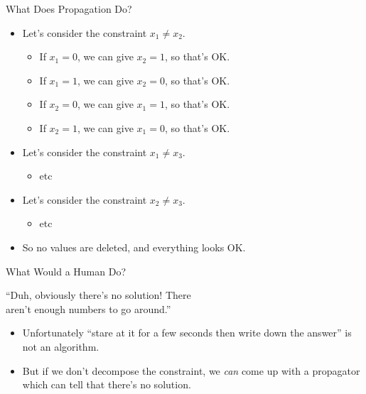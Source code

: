 \documentclass{beamer}
\begin{document}
\begin{frame}{What Does Propagation Do?}

    \begin{itemize}
        \item Let's consider the constraint $x_1 \ne x_2$.
            \begin{itemize}
                \item If $x_1 = 0$, we can give $x_2 = 1$, so that's OK.
                \item If $x_1 = 1$, we can give $x_2 = 0$, so that's OK.
                \item If $x_2 = 0$, we can give $x_1 = 1$, so that's OK.
                \item If $x_2 = 1$, we can give $x_1 = 0$, so that's OK.
            \end{itemize}
        \item Let's consider the constraint $x_1 \ne x_3$.
            \begin{itemize}
                \item etc
            \end{itemize}
        \item Let's consider the constraint $x_2 \ne x_3$.
            \begin{itemize}
                \item etc
            \end{itemize}
        \item So no values are deleted, and everything looks OK.
    \end{itemize}

\end{frame}

\begin{frame}{What Would a Human Do?}
    \begin{center}
        ``Duh, obviously there's no solution! There \\ aren't enough numbers to go around.''
    \end{center}

    \begin{itemize}
        \item Unfortunately ``stare at it for a few seconds then write down the answer'' is not an algorithm.

        \item But if we don't decompose the constraint, we \emph{can} come up with a propagator
            which can tell that there's no solution.
    \end{itemize}
\end{frame}
\end{document}
